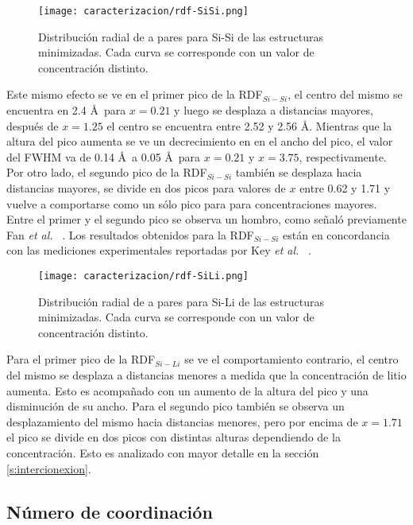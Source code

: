 \begin{figure}[h!]
    \centering
    \texttt{[image: caracterizacion/rdf-SiSi.png]}
    \caption{Distribución radial de a pares para Si-Si de las estructuras 
    minimizadas. Cada curva se corresponde con un valor de concentración 
    distinto.}
    \label{fig:rdf-SiSi}
\end{figure}
Este mismo efecto se ve en el primer pico de la RDF$_{Si-Si}$, el centro del mismo
se encuentra en 2.4 \AA\ para $x = 0.21$ y luego se desplaza a distancias
mayores, después de $x = 1.25$ el centro se encuentra entre 2.52 y 2.56 \AA.
Mientras que la altura del pico aumenta se ve un decrecimiento en en el ancho 
del pico, el valor del FWHM va de 0.14 \AA\ a 0.05 \AA\ para $x = 0.21$ y 
$x = 3.75$, respectivamente. Por otro lado, el segundo pico de la RDF$_{Si-Si}$
también se desplaza hacia distancias mayores, se divide en dos picos para valores 
de $x$ entre 0.62 y 1.71 y vuelve a comportarse como un sólo pico para para 
concentraciones mayores. Entre el primer y el segundo pico se observa un hombro,
como señaló previamente Fan \textit{et al.} ~\cite{fan2013}. Los resultados 
obtenidos para la RDF$_{Si-Si}$ están en concordancia con las mediciones 
experimentales reportadas por Key \textit{et al.} ~\cite{key2011}.

\begin{figure}[h!]
    \centering
    \texttt{[image: caracterizacion/rdf-SiLi.png]}
    \caption{Distribución radial de a pares para Si-Li de las estructuras 
    minimizadas. Cada curva se corresponde con un valor de concentración 
    distinto.}
    \label{fig:rdf-SiLi}
\end{figure}
Para el primer pico de la RDF$_{Si-Li}$ se ve el comportamiento contrario, el 
centro del mismo se desplaza a distancias menores a medida que la concentración
de litio aumenta. Esto es acompañado con un aumento de la altura del pico y una
disminución de su ancho. Para el segundo pico también se observa un desplazamiento
del mismo hacia distancias menores, pero por encima de $x = 1.71$ el pico se
divide en dos picos con distintas alturas dependiendo de la concentración. Esto
es analizado con mayor detalle en la sección \ref{s:intercionexion}.

\subsection{Número de coordinación}

